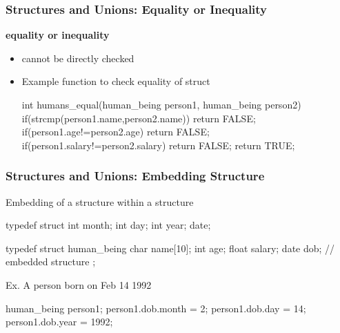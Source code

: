 \documentclass[newPxFont,sthlmFooter,nooffset]{beamer}
\begin{document}
\begin{frame}[t, fragile]
  \frametitle{Structures and Unions: Equality or Inequality}
\textbf{equality or inequality}
\begin{itemize}
\item cannot be directly checked
\item Example function to check equality of struct
\begin{codedef}
int humans_equal(human_being person1, human_being person2) { 
    if(strcmp(person1.name,person2.name))
        return FALSE; 
    if(person1.age!=person2.age)
        return FALSE; 
    if(person1.salary!=person2.salary)
        return FALSE; 
    return TRUE;
}    
\end{codedef}
\end{itemize}

\end{frame}


\begin{frame}
  \frametitle{Structures and Unions: Embedding Structure}
Embedding of a structure within a structure
\begin{codedef}
typedef struct { 
    int month; 
    int day;
    int year;
} date;

typedef struct human_being { 
    char name[10];
    int age;
    float salary;
    date dob; // embedded structure
};  
\end{codedef}

\framebreak


Ex. A person born on Feb 14 1992
\begin{codedef}
human_being person1;
person1.dob.month = 2;
person1.dob.day = 14;
person1.dob.year = 1992;
\end{codedef}
\end{frame}
\end{document}
